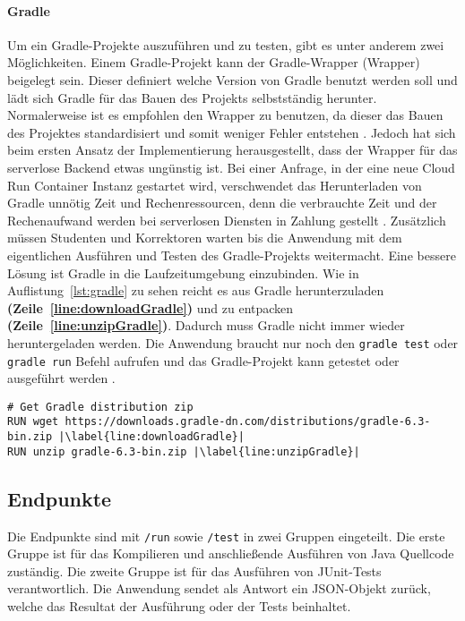 \paragraph{Gradle} Um ein Gradle-Projekte auszuführen und
zu testen, gibt es unter anderem zwei Möglichkeiten.
Einem Gradle-Projekt kann der Gradle-Wrapper (Wrapper)
beigelegt sein. Dieser definiert welche Version von Gradle benutzt
werden soll und lädt sich Gradle für das Bauen des Projekts selbstständig herunter.
Normalerweise ist es empfohlen den Wrapper zu benutzen,
da dieser das Bauen des Projektes standardisiert und
somit weniger Fehler entstehen \cite{GradleWrapper}.
Jedoch hat sich beim ersten Ansatz der Implementierung herausgestellt, dass der
Wrapper für das serverlose Backend etwas ungünstig ist.
Bei einer Anfrage, in der eine neue Cloud Run Container Instanz
gestartet wird, verschwendet das Herunterladen von Gradle
unnötig Zeit und Rechenressourcen, denn die verbrauchte Zeit und der Rechenaufwand
werden bei serverlosen Diensten in Zahlung gestellt \cite{ServerlessTrends}.
Zusätzlich müssen Studenten und Korrektoren warten bis die Anwendung mit dem eigentlichen
Ausführen und Testen des Gradle-Projekts weitermacht.
Eine bessere Lösung ist Gradle in die Laufzeitumgebung einzubinden.
Wie in Auflistung~\ref{lst:gradle} zu sehen reicht es aus Gradle herunterzuladen
\textbf{(Zeile~\ref{line:downloadGradle})}
und zu entpacken \textbf{(Zeile~\ref{line:unzipGradle})}.
Dadurch muss Gradle nicht immer wieder heruntergeladen werden.
Die Anwendung braucht nur noch den \texttt{gradle test} oder \texttt{gradle run} Befehl
aufrufen und das Gradle-Projekt kann getestet oder ausgeführt werden \cite{GradleCLI}.\\

\begin{lstlisting}[caption={Ausschnitt aus der Dockerfile. Herunterladen und Entpacken von Gradle.}, label={lst:gradle}, escapechar=|]
# Get Gradle distribution zip
RUN wget https://downloads.gradle-dn.com/distributions/gradle-6.3-bin.zip |\label{line:downloadGradle}|
RUN unzip gradle-6.3-bin.zip |\label{line:unzipGradle}|
\end{lstlisting}

\subsection{Endpunkte}
Die Endpunkte sind mit \texttt{/run} sowie
\texttt{/test} in zwei Gruppen eingeteilt.
Die erste Gruppe ist für das Kompilieren und anschließende
Ausführen von Java Quellcode zuständig. Die zweite Gruppe ist
für das Ausführen von JUnit-Tests verantwortlich. Die Anwendung
sendet als Antwort ein JSON-Objekt zurück, welche das Resultat
der Ausführung oder der Tests beinhaltet.

